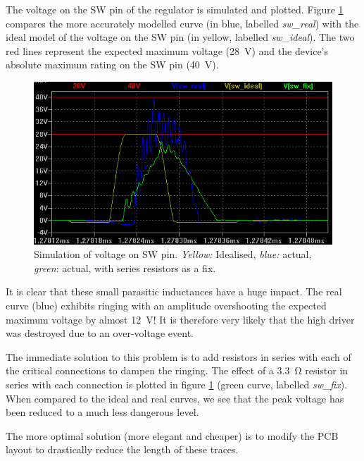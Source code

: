 The voltage on the SW pin of the regulator  is  simulated  and  plotted.  Figure
\ref{fig:verification:long_traces_simulation}  compares  the   more   accurately
modelled curve (in blue, labelled \emph{sw\_real})  with  the ideal model of the
voltage on the SW pin (in yellow, labelled \emph{sw\_ideal}). The  two red lines
represent  the  expected  maximum  voltage  (\SI{28}{\volt})  and  the  device's
absolute maximum rating on the SW pin (\SI{40}{\volt}).

\begin{figure}[th!]
    \centering
    \includegraphics[width=.7\textwidth]{images/sim/lt3741-transients-sim.png}
    \caption{Simulation of voltage on SW pin. \emph{Yellow:} Idealised, \emph{blue:} actual, \emph{green}: actual, with series resistors as a fix.}
    \label{fig:verification:long_traces_simulation}
\end{figure}

It is clear that these small parasitic  inductances have a huge impact. The real
curve  (blue) exhibits ringing  with  an  amplitude  overshooting  the  expected
maximum voltage by  almost  \SI{12}{\volt}! It is therefore very likely that the
high driver was destroyed due to an over-voltage event.

The immediate solution to this problem  is  to add resistors in series with each
of  the  critical  connections  to  dampen  the  ringing.  The   effect   of   a
\SI{3.3}{\ohm} resistor in series  with  each  connection  is  plotted in figure
\ref{fig:verification:long_traces_simulation}     (green     curve,     labelled
\emph{sw\_fix}). When compared  to  the  ideal  and real curves, we see that the
peak voltage has been reduced to a much less dangerous level.

The more  optimal solution  (more elegant  and cheaper) is  to modify  the PCB
layout to drastically reduce the length of these traces.

